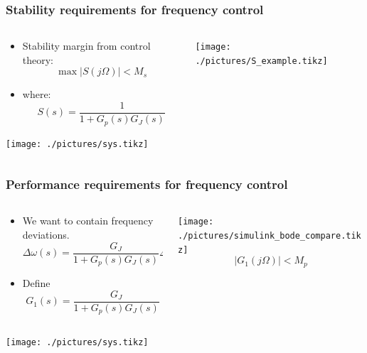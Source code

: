 \begin{frame}
	\frametitle{Stability requirements for frequency control}
	\begin{columns}
			\begin{column}[T]{0.5\textwidth}
			\begin{itemize}
				\item Stability margin from control theory:
				\begin{equation}
					\max |S(j\Omega)| <	M_s
				\end{equation}
			\item where:
				\begin{equation}
						S(s) = \frac{1}{1+G_p(s)G_J(s)}
				\end{equation}
			\end{itemize}
			\texttt{[image: ./pictures/sys.tikz]}
		\end{column}
		\begin{column}[T]{0.5\textwidth}
				\texttt{[image: ./pictures/S\_example.tikz]}
		\end{column}
	\end{columns}
\end{frame}
\begin{frame}
	\frametitle{Performance requirements for frequency control}
	\begin{columns}
			\begin{column}[T]{0.5\textwidth}
			\begin{itemize}
				\item We want to contain frequency deviations.
					\begin{equation}
							\Delta \omega(s) = \frac{G_{J}}{1+G_p(s)G_J(s)}\Delta P_e(s)
					\end{equation}
				\item Define
					\begin{equation}
						G_1(s) = \frac{G_{J}}{1+G_p(s)G_J(s)}
					\end{equation}
			\end{itemize}
		\end{column}
		\begin{column}[T]{0.5\textwidth}
			\texttt{[image: ./pictures/simulink\_bode\_compare.tikz]}
			\begin{equation}
				|G_1(j\Omega)| < M_p
		\end{equation}
		\end{column}
	\end{columns}
	\texttt{[image: ./pictures/sys.tikz]}
\end{frame}
